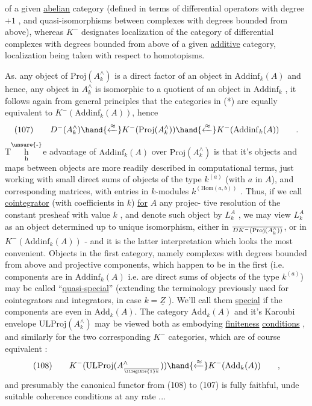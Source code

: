 
of a given \uline{abelian} category (defined in terms of differential operators
with degree $+1$ , and quasi-isomorphisms between complexes with degrees
bounded from above), whereas $K^-$ designates localization of the category
of differential complexes with degrees bounded from above of a given
\uline{additive} category, localization being taken with respect to homotopisms.

As. any object of $\mathrm{Proj}(A^{\wedge}_k)$ is a direct factor of an object in $\mathrm{Addinf}_k(A)$
and hence, any object in $A^{\wedge}_k$ is isomorphic to a quotient of an object in
$\mathrm{Addinf}_k$ , it follows again from general principles that the categories in
(*) are equally equivalent to $K^-(\mathrm{Addinf}_k(A))$, hence
\[ (107) \qquad D^-(A^{\wedge}_k)\hand{\xleftarrow{\approx}}K^-(\mathrm{Proj}(A^{\wedge}_k))\hand{\xleftarrow{\approx}}K^-(\mathrm{Addinf}_k(A)) \qquad . \]
T\(\overset{\unsure{\text{-}}}{\underset{\text{h}}{\text{h}}}\)e advantage of $\mathrm{Addinf}_k(A)$ over $\mathrm{Proj}(A^{\wedge}_k)$ is that it's objects\hand{,} and maps
between objects\hand{,} are more readily described in computational terms, just
working with small direct sums of objects of the type $k^{(a)}$ (with $a$ in $A$),
and corresponding matrices, with entries in  $k$-modules $k^{(\mathrm{Hom}(a,b))}$ .
Thus, if we call \uline{cointegrator} (with coefficients in $k$) \uline{for} $A$ any projec-%
tive resolution of the constant  presheaf  with value $k$ , and denote
such object by $L^A_k$ , we may view $L^A_k$ as an object determined up to unique
isomorphism, either in $\over{D}{K}^-(\mathrm{Proj}(A^{\wedge}_k))$, or in $K^-(\mathrm{Addinf}_k(A))$ - and it is
the latter interpretation which looks the most convenient. Objects in the
first category, namely complexes with degrees bounded from above
and projective components, which happen to be in the first (i.e. components
are in $\mathrm{Addinf}_k(A)$ i.e. are direct sums of objects of the type $k^{(a)}$) may
be called ``\uline{quasi-special}'' (extending the terminology previously used for
cointegrators and integrators, in case $k=\underline{Z}$ ). We'll call them \uline{special}
if the components are even in $\mathrm{Add}_k(A)$. The category $\mathrm{Add}_k(A)$ and it's
Karoubi envelope $\mathrm{ULProj}(A^{\wedge}_k)$ may be viewed both as embodying \uline{finiteness}
\uline{conditions} , and similarly for the two corresponding $K^-$ categories, which
are of course equivalent :
\[ (108) \qquad K^-(\mathrm{ULProj}(A^{\wedge}_{\over{\illegible{1}}{k}}))\hand{\xleftarrow{\approx}} K^-(\mathrm{Add}_k(A)) \qquad , \]
and presumably the canonical functor from (108) to (107) is fully faithful,
unde suitable coherence conditions at any rate ...

